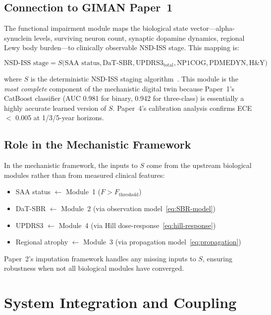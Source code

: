 \subsection{Connection to GIMAN Paper~1}

The functional impairment module maps the biological state vector---alpha-synuclein levels, surviving neuron count, synaptic dopamine dynamics, regional Lewy body burden---to clinically observable NSD-ISS stage. This mapping is:

\begin{equation}
\text{NSD-ISS stage} = S\bigl(\text{SAA status}, \text{DaT-SBR}, \text{UPDRS3}_\text{total}, \text{NP1COG}, \text{PDMEDYN}, \text{H\&Y}\bigr)
\label{eq:staging-function}
\end{equation}

where $S$ is the deterministic NSD-ISS staging algorithm~\cite{simuni2024}. This module is the \textit{most complete} component of the mechanistic digital twin because Paper~1's CatBoost classifier (AUC 0.981 for binary, 0.942 for three-class) is essentially a highly accurate learned version of $S$. Paper~4's calibration analysis confirms ECE $<$ 0.005 at 1/3/5-year horizons.

\subsection{Role in the Mechanistic Framework}

In the mechanistic framework, the inputs to $S$ come from the upstream biological modules rather than from measured clinical features:
\begin{itemize}
\item SAA status $\leftarrow$ Module~1 ($F > F_\text{threshold}$)
\item DaT-SBR $\leftarrow$ Module~2 (via observation model~\eqref{eq:SBR-model})
\item UPDRS3 $\leftarrow$ Module~4 (via Hill dose-response~\eqref{eq:hill-response})
\item Regional atrophy $\leftarrow$ Module~3 (via propagation model~\eqref{eq:propagation})
\end{itemize}

Paper~2's imputation framework handles any missing inputs to $S$, ensuring robustness when not all biological modules have converged.


\section{System Integration and Coupling}
\label{sec:mech-integration}

